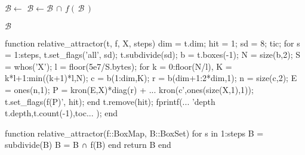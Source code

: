\documentclass[12pt,a4paper,twoside]{article}
\begin{document}

\begin{algorithm}
    \begin{algorithmic}[1]

            \State $\mathcal{B} \gets$ 
            \State $\mathcal{B} \gets \mathcal{B}\, \cap\, f (\,\mathcal{B}\,)$
        \EndFor

        \State \Return $\mathcal{B}$ 
    \end{algorithmic}
\end{algorithm}

\clearpage

\pagebreak

\begin{jllisting}[float, language=matlab, style=jlcodestyle, label=lst:gum:matlab, captionpos=b]
function relative_attractor(t, f, X, steps)
dim = t.dim; hit = 1; sd = 8; tic;
for s = 1:steps,
    t.set_flags('all', sd);
    t.subdivide(sd);
    b = t.boxes(-1); N = size(b,2);
    S = whos('X'); l = floor(5e7/S.bytes);
    for k = 0:floor(N/l), 
        K = k*l+1:min((k+1)*l,N);
        c = b(1:dim,K);  
        r = b(dim+1:2*dim,1);  
        n = size(c,2); E = ones(n,1);       
        P = kron(E,X)*diag(r) + ...  
            kron(c',ones(size(X,1),1));
        t.set_flags(f(P)', hit); 
    end
    t.remove(hit); 
    fprintf(...
        'depth %
        t.depth,t.count(-1),toc...
    );
end
\end{jllisting}

\clearpage

\pagebreak

\begin{jllisting}[float, language=julia, style=jlcodestyle, label=lst:gum:julia, captionpos=b]
    function relative_attractor(f::BoxMap, B::BoxSet)
        for s in 1:steps
            B = subdivide(B)
            B = B ∩ f(B)
        end
        return B
    end
\end{jllisting}
\end{document}
